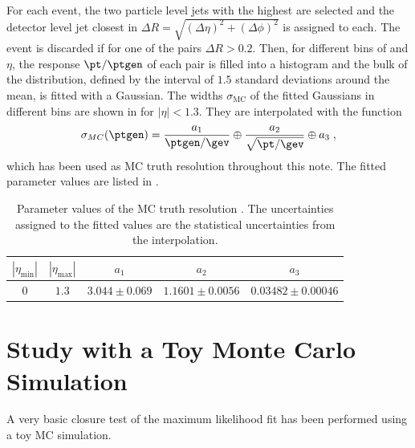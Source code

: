 For each event, the two particle level jets with the highest \ptgen
are selected and the detector level jet closest in
\mbox{$\Delta R = \sqrt{(\Delta\eta)^{2} + (\Delta\phi)^{2}}$} is assigned to each.
The event is discarded if for one of the pairs $\Delta R > 0.2$.
Then, for different bins of \ptgen and $\eta$, the response $\pt/\ptgen$ of each pair is filled into a
histogram and the bulk of the distribution, defined by the interval of
$1.5$ standard deviations around the mean, is fitted with a Gaussian.
The widths $\sigma_{\text{MC}}$ of the fitted Gaussians in different \ptgen
bins are shown in  for \mbox{$|\eta| < 1.3$}.
They are interpolated with the function
\begin{equation}
  \label{eq:ResFit:MCTruthReso}
  \sigma_{MC}(\ptgen) = \frac{a_{1}}{\ptgen/\gev} \oplus
  \frac{a_{2}}{\sqrt{\pt/\gev}} \oplus a_{3} \; ,
\end{equation}
which has been used as MC truth resolution throughout this note.
The fitted parameter values are listed in .

\begin{table}[ht]
  \caption{Parameter values of the MC truth resolution .
    The uncertainties assigned to the fitted values are the
    statistical uncertainties from the interpolation.}
  \centering
  \begin{tabular}[ht]{ccccc}
    \toprule
    $|\eta_{\text{min}}|$ & $|\eta_{\text{max}}|$ & $a_{1}$ & $a_{2}$ & $a_{3}$ \\
    \midrule
    $0$ & $1.3$ & $3.044 \pm 0.069$ & $1.1601 \pm 0.0056$ & $0.03482 \pm 0.00046$ \\
   \bottomrule
  \end{tabular}
  \label{tab:ResFit:MCTruthReso}
\end{table}



\section{Study with a Toy Monte Carlo Simulation}\label{sec:ResFit:App:ToyMC}

A very basic closure test of the maximum likelihood fit has been performed using a toy MC simulation.


